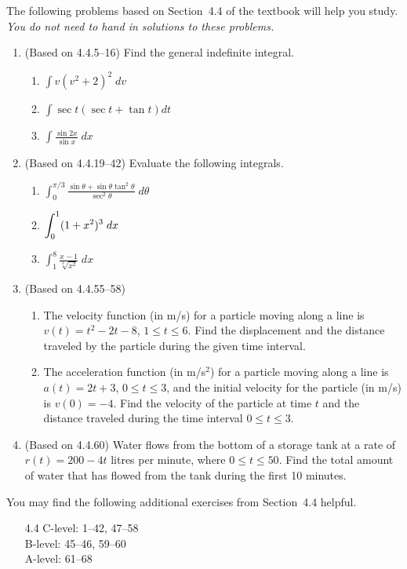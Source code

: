 \documentclass{article}
\title{\commonPSTitleZeroFourFour}
\author{\commonAuthor}
\date{\commonDateZeroFourFour}
\newcommand{\ds}{\displaystyle}
\begin{document}
\maketitle
\thispagestyle{empty}

\noindent
The following problems based on Section~4.4 of the textbook will help
you study.  \emph{You do not need to hand in solutions to these
  problems.}
\begin{enumerate}
\item (Based on 4.4.5--16) %
  Find the general indefinite integral.
  \begin{multicols}{3}
  \begin{enumerate}
  \item $\ds \int v(v^2+2)^2 \; dv$
  \item $\ds \int \sec t(\sec t+\tan t)dt$
  \item $\ds \int \frac{\sin 2x}{\sin x} \; dx$
  \end{enumerate}
  \end{multicols}
\item (Based on 4.4.19--42) %
  Evaluate the following integrals.
  \begin{multicols}{3}
  \begin{enumerate}
  \item $\ds \int_0^{\pi/3} 
    \frac{\sin\theta+\sin\theta\tan^2\theta}{\sec^2\theta} \; d\theta$
  \item $\ds \int_0^1 (1+x^2)^3 \; \vphantom{\frac{1}{\sqrt[3]{x^2}}} dx$
  \item $\ds \int_1^8 \frac{x-1}{\sqrt[3]{x^2}} \; dx$
  \end{enumerate}
  \end{multicols}
\item (Based on 4.4.55--58) %
  \begin{enumerate}
  \item The velocity function (in m/s) for a particle moving along a line
    is $v(t)=t^2-2t-8$, $1\le t\le 6$.  Find the displacement and the 
    distance traveled by the particle during the given time interval.
  \item The acceleration function (in m/s$^2$) for a particle moving along
    a line is $a(t)=2t+3$, $0\le t\le 3$,
    and the initial velocity for the particle (in m/s) is $v(0)=-4$.
    Find the velocity of the particle at time $t$ and the distance
    traveled during the time interval $0\le t\le 3$.
  \end{enumerate} 
\item (Based on 4.4.60) %
  Water flows from the bottom of a storage tank at a rate of
  $r(t)=200-4t$ litres per minute, where $0\le t\le 50$.  Find
  the total amount of water that has flowed from the tank during
  the first 10 minutes.
\end{enumerate}

\noindent
You may find the following additional exercises from Section~4.4
helpful.
\begin{itemize}
\item[4.4]
  C-level: 1--42, 47--58 \\
  B-level: 45--46, 59--60 \\
  A-level: 61--68
\end{itemize}
\end{document}
